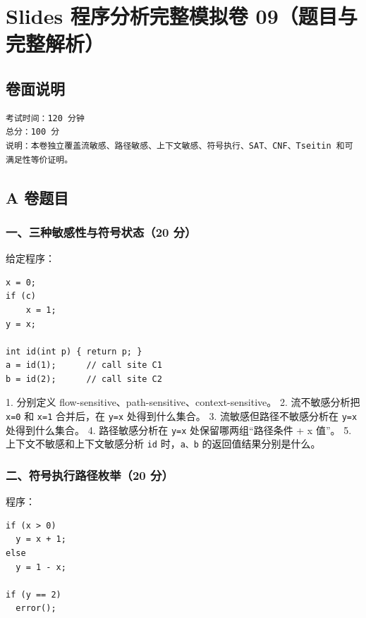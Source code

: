 \documentclass[UTF8]{ctexart}
\begin{document}
\section*{Slides 程序分析完整模拟卷 09（题目与完整解析）}

\subsection*{卷面说明}

\begin{Verbatim}[fontsize=\small,breaklines=true]
考试时间：120 分钟
总分：100 分
说明：本卷独立覆盖流敏感、路径敏感、上下文敏感、符号执行、SAT、CNF、Tseitin 和可满足性等价证明。
\end{Verbatim}

\subsection*{A 卷题目}

\subsubsection*{一、三种敏感性与符号状态（20 分）}

给定程序：

\begin{Verbatim}[fontsize=\small,breaklines=true]
x = 0;
if (c)
    x = 1;
y = x;

int id(int p) { return p; }
a = id(1);      // call site C1
b = id(2);      // call site C2
\end{Verbatim}

1. 分别定义 flow-sensitive、path-sensitive、context-sensitive。 2. 流不敏感分析把 \texttt{x=0} 和 \texttt{x=1} 合并后，在 \texttt{y=x} 处得到什么集合。 3. 流敏感但路径不敏感分析在 \texttt{y=x} 处得到什么集合。 4. 路径敏感分析在 \texttt{y=x} 处保留哪两组“路径条件 + x 值”。 5. 上下文不敏感和上下文敏感分析 \texttt{id} 时，\texttt{a、b} 的返回值结果分别是什么。

\subsubsection*{二、符号执行路径枚举（20 分）}

程序：

\begin{Verbatim}[fontsize=\small,breaklines=true]
if (x > 0)
  y = x + 1;
else
  y = 1 - x;

if (y == 2)
  error();
\end{Verbatim}
\end{document}
